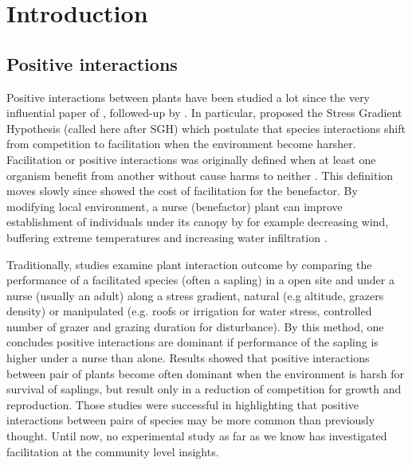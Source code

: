 \documentclass[12pt]{article} %
\begin{document}
\section{Introduction}

\subsection{Positive interactions}
Positive interactions between plants have been studied a lot since the very influential paper of \citep{Bertness1994}, followed-up by \citep{Bruno2003}. In particular, \citet{Bertness1994} proposed the Stress Gradient Hypothesis (called here after SGH) which postulate that species interactions shift from competition to facilitation when the environment become harsher. Facilitation or positive interactions was originally defined when at least one organism benefit from another without cause harms to neither \citep{Bruno2003}. This definition moves slowly since \citet{Schob2014} showed the cost of facilitation for the benefactor.
By modifying local environment, a nurse (benefactor) plant can improve establishment of individuals under its canopy by for example decreasing wind, buffering extreme temperatures and increasing water infiltration \citep{Rietkerk1997}. 

Traditionally, studies examine plant interaction outcome by comparing the performance of a facilitated species (often a sapling) in a open site and under a nurse (usually an adult) along a stress gradient, natural (e.g altitude, grazers density) or manipulated (e.g. roofs or irrigation for water stress, controlled number of grazer and grazing duration for disturbance).
By this method, one concludes positive interactions are dominant if performance of the sapling is higher under a nurse than alone. Results showed that positive interactions between pair of plants become often dominant when the environment is harsh for survival of saplings, but result only in a reduction of competition for growth and reproduction\citep{He2013}.
Those studies were successful in highlighting that positive interactions between pairs of species may be more common than previously thought. Until now, no experimental study as far as we know has investigated facilitation at the community level insights. 
\end{document}
